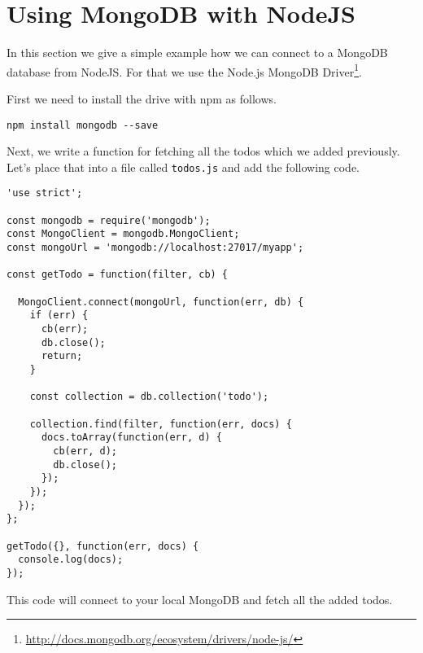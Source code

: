 \section{Using MongoDB with NodeJS}\label{sec:using_mongodb_with_nodejs}
In this section we give a simple example how we can connect to a MongoDB database from NodeJS. For that we use the Node.js MongoDB Driver\footnote{\url{http://docs.mongodb.org/ecosystem/drivers/node-js/}}.

First we need to install the drive with npm as follows.

\begin{lstlisting}
npm install mongodb --save
\end{lstlisting}

Next, we write a function for fetching all the todos which we added previously. Let's place that into a file called \texttt{todos.js} and add the following code.

\begin{lstlisting}
'use strict';

const mongodb = require('mongodb');
const MongoClient = mongodb.MongoClient;
const mongoUrl = 'mongodb://localhost:27017/myapp';

const getTodo = function(filter, cb) {

  MongoClient.connect(mongoUrl, function(err, db) {
    if (err) {
      cb(err);
      db.close();
      return;
    }

    const collection = db.collection('todo');

    collection.find(filter, function(err, docs) {
      docs.toArray(function(err, d) {
        cb(err, d);
        db.close();
      });
    });
  });
};

getTodo({}, function(err, docs) {
  console.log(docs);
});
\end{lstlisting}

This code will connect to your local MongoDB and fetch all the added todos.
